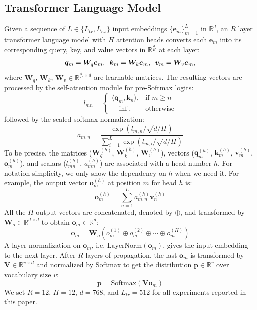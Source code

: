 \documentclass[11pt]{article}
\theoremstyle{plain}
\begin{document}
\subsection{Transformer Language Model}
Given a sequence of $L\in\{L_{tr}, L_{ex}\}$ input embeddings $\{\bm e_m\}_{m=1}^L$ in $\mathbb{R}^d$, an $R$ layer transformer language model with $H$ attention heads converts each $\bm e_m$ into its corresponding query, key, and value vectors in $\mathbb{R}^\frac{d}{H}$ at each layer:
\begin{align*}
    \bm q_m=\bm W_q\bm e_m,\enskip\bm k_m=\bm W_k\bm e_m,\enskip\bm v_m=\bm W_v\bm e_m,
\end{align*}
where $\bm W_q$, $\bm W_k$, $\bm W_v\in\mathbb{R}^{\frac{d}{H} \times d}$ are learnable matrices. The resulting vectors are processed by the self-attention module for pre-Softmax logits:
\begin{equation*}
    l_{mn}= 
\begin{cases}
    \langle \bm q_m, \bm k_n \rangle,& \text{if } m\geq n\\
    -\inf,              & \text{otherwise}
\end{cases}
\end{equation*}
followed by the scaled softmax normalization:
\begin{equation}
\label{eq:scaled_softmax}
    a_{m,n}=\frac{\exp(l_{m,n}/\sqrt{d/H})}{\sum_{i=1}^L \exp(l_{m,i}/\sqrt{d/H})}
\end{equation}
To be precise, the matrices ($\bm W_q^{(h)}$, $\bm W_k^{(h)}$, $\bm W_v^{(h)}$), vectors ($\bm q_m^{(h)}$, $\bm k_m^{(h)}$, $\bm v_m^{(h)}$, $\bm o_m^{(h)}$), and scalars ($l_{mn}^{(h)}$, $a_{mn}^{(h)}$) are associated with a head number $h$. For notation simplicity, we only show the dependency on $h$ when we need it. For example, the output vector $\bm o_m^{(h)}$ at position $m$ for head $h$ is:
\begin{equation*}
    \bm o_m^{(h)} = \sum_{n=1}^L a_{m,n}^{(h)}\bm v_n^{(h)}
\end{equation*}
All the $H$ output vectors are concatenated, denoted by $\oplus$, and transformed by $\bm W_o\in\mathbb{R}^{d\times d}$ to obtain $\bm o_m\in \mathbb{R}^{d}$:
\begin{equation*}
    \bm o_m = \bm W_o (o_m^{(1)} \oplus o_m^{(2)} \oplus \cdots \oplus o_m^{(H)})
\label{eq:om}
\end{equation*}
A layer normalization \cite{ba2016layernorm} on $\bm o_m$, i.e. $\text{LayerNorm}(\bm o_m)$, gives the input embedding to the next layer. After $R$ layers of propagation, the last $\bm o_m$ is transformed by $\bm V\in \mathbb{R}^{v\times d}$ and normalized by Softmax to get the distribution $\bm p\in \mathbb{R}^v$ over vocabulary size $v$:
\begin{equation}
    \bm p = \text{Softmax}(\bm V\bm o_m)
    \label{eq:prob}
\end{equation}
We set $R=12$, $H=12$, $d=768$, and $L_{tr}=512$ for all experiments reported in this paper.
\end{document}

